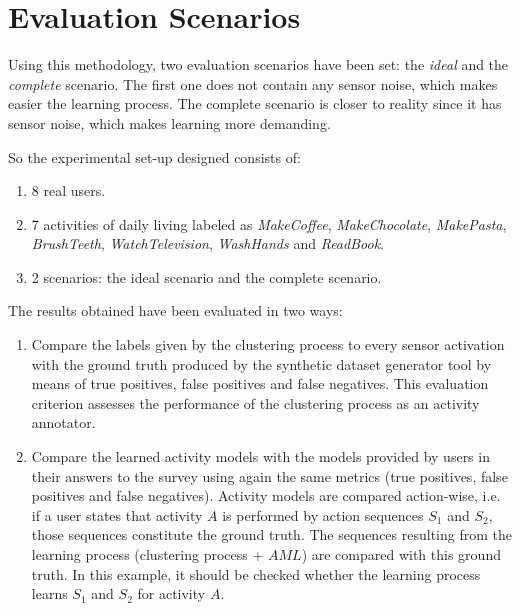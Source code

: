 \section{Evaluation Scenarios}
\label{sec:evaluation:scenarios}

Using this methodology, two evaluation scenarios have been set: the \textit{ideal} and the \textit{complete} scenario. The first one does not contain any sensor noise, which makes easier the learning process. The complete scenario is closer to reality since it has sensor noise, which makes learning more demanding.

So the experimental set-up designed consists of: 

\begin{enumerate}
 \item 8 real users.
 \item 7 activities of daily living labeled as \textit{MakeCoffee}, \textit{MakeChocolate}, \textit{MakePasta}, \textit{BrushTeeth}, \textit{WatchTelevision}, \textit{WashHands} and \textit{ReadBook}. 
 \item 2 scenarios: the ideal scenario and the complete scenario.
\end{enumerate}

The results obtained have been evaluated in two ways: 

\begin{enumerate}
 \item Compare the labels given by the clustering process to every sensor activation with the ground truth produced by the synthetic dataset generator tool by means of true positives, false positives and false negatives. This evaluation criterion assesses the performance of the clustering process as an activity annotator.
 \item Compare the learned activity models with the models provided by users in their answers to the survey using again the same metrics (true positives, false positives and false negatives). Activity models are compared action-wise, i.e. if a user states that activity $A$ is performed by action sequences $S_1$ and $S_2$, those sequences constitute the ground truth. The sequences resulting from the learning process (clustering process + $AML$) are compared with this ground truth. In this example, it should be checked whether the learning process learns $S_1$ and $S_2$ for activity $A$.
\end{enumerate}